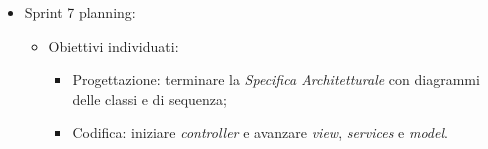 \begin{itemize}
  \item Sprint 7 planning:
        \begin{itemize}
          \item Obiettivi individuati:
                \begin{itemize}
                  \item Progettazione: terminare la \textit{Specifica Architetturale} con diagrammi delle classi e di sequenza;
                  \item Codifica: iniziare \textit{controller} e avanzare \textit{view}, \textit{services} e \textit{model}.
                \end{itemize}
        \end{itemize}
\end{itemize}
